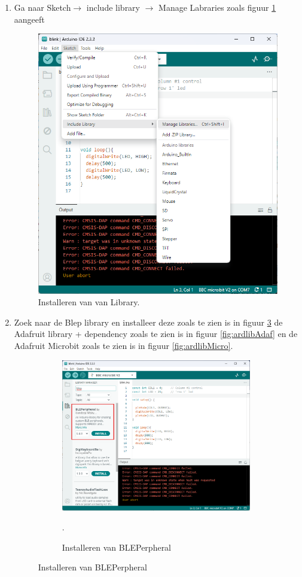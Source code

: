 \begin{enumerate}
	\item Ga naar Sketch$\rightarrow$ include library $\rightarrow$ Manage Labraries zoals figuur \ref{fig:ardLib} aangeeft
	
	   	\begin{figure}[h!]
		\captionsetup{justification=centering}
		\includegraphics[width=0.45 \linewidth]{figuren/arduino_lib}
		\centering
		\caption{Installeren van van Library.}
		\label{fig:ardLib}
	\end{figure}
	\item Zoek naar de Blep library en installeer deze zoals te zien is in figuur \ref{fig:ardlibBl} de Adafruit library + dependency zoals te zien is in figuur \ref{fig:ardlibAdaf} en de Adafruit Microbit zoals te zien is in figuur \ref{fig:ardlibMicro}.
	
\begin{figure}[h!]
	\centering
		\begin{center} 	
			\begin{subfigure}[b]{0.31\textwidth}
				\includegraphics[width=0.98\textwidth]{figuren/arduinoManLibBlep}
				\caption{Installeren van BLEPerpheral }.
				\label{fig:ardlibBl}
				

\end{subfigure}
\end{center}
\end{figure}
\end{enumerate}
